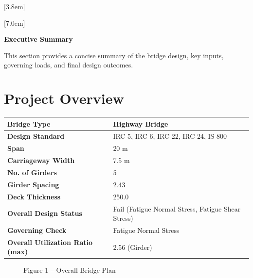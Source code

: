 \documentclass[12pt,a4paper]{report}
\numberwithin{table}{chapter}
\numberwithin{figure}{chapter}
\begin{document}
[3.8em]
  {\normalfont}
  {\contentslabel{2.3em}}
  {\hspace*{-2.3em}}
  {\hfill\contentspage}

[7.0em]
  {\normalfont}
  {\contentslabel{3.2em}}
  {\hspace*{-3.2em}}
  {\hfill\contentspage}

\newpage
\renewcommand{\contentsname}{\centering\Large\bfseries Table of Contents}
\tableofcontents


\newpage
{\centering\Large\bfseries Executive Summary\par}
\vspace{0.8em}

This section provides a concise summary of the bridge design, key inputs, governing loads, and final design outcomes.

\section*{Project Overview}
\label{sec:project-overview}


\begin{tabular}{|L{5.5cm}|L{8.5cm}|}
\hline
\textbf{Bridge Type} & Highway Bridge \\
\hline
\textbf{Design Standard} & IRC 5, IRC 6, IRC 22, IRC 24, IS 800 \\
\hline
\textbf{Span} & 20 m \\
\hline
\textbf{Carriageway Width} & 7.5 m \\
\hline
\textbf{No. of Girders} & 5 \\
\hline
\textbf{Girder Spacing} & 2.43 \\
\hline
\textbf{Deck Thickness} & 250.0 \\
\hline
\textbf{Overall Design Status} & Fail (Fatigue Normal Stress, Fatigue Shear Stress) \\
\hline
\textbf{Governing Check} & Fatigue Normal Stress \\
\hline
\textbf{Overall Utilization Ratio (max)} & 2.56 (Girder) \\
\hline
\end{tabular}


\begin{figure}[H]
\centering
{}
\caption*{Figure 1 -- Overall Bridge Plan}
\end{figure}
\end{document}
